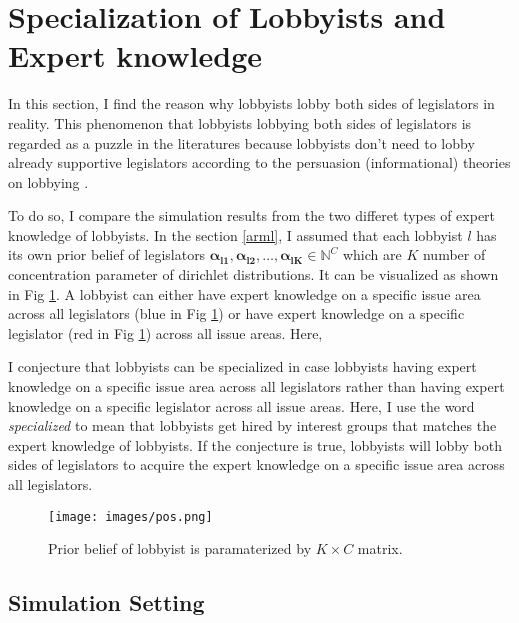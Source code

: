 \documentclass{article}
\begin{document}
\section{Specialization of Lobbyists and Expert knowledge}

In this section, I find the reason
why lobbyists lobby both sides of legislators in reality.
This phenomenon that lobbyists lobbying both sides of legislators 
is regarded as a puzzle in the literatures because lobbyists don't need to 
lobby already supportive legislators according to the persuasion (informational) theories on lobbying \citep{10.2307/2586303}.


To do so, I compare the simulation results from the two differet types of expert knowledge of lobbyists.
In the section \ref{arml}, I assumed 
that each lobbyist $l$ has its own prior belief of legislators $\mathbf{\alpha_{l1}}, \mathbf{\alpha_{l2}}, \hdots, \mathbf{\alpha_{lK}} \in \mathbb{N}^C$ which are $K$ number of concentration parameter of dirichlet distributions.
It can be visualized as shown in Fig \ref{fig:mesh1}. 
A lobbyist can either have expert knowledge 
on a specific issue area across all legislators (blue in Fig \ref{fig:mesh1}) or
have expert knowledge on a specific legislator (red in Fig \ref{fig:mesh1})
across all issue areas. 
Here, 

I conjecture that lobbyists can be specialized 
in case lobbyists having 
expert knowledge on a specific issue area across all legislators
rather than having expert knowledge 
on a specific legislator across all issue areas.
Here, I use the word \textit{specialized} to mean that
lobbyists get hired by interest groups 
that matches the expert knowledge of lobbyists.
If the conjecture is true, 
lobbyists will lobby both sides of legislators
to acquire 
the expert knowledge on a specific issue area
across all legislators.

\begin{figure}[h!]
    \centering
    \texttt{[image: images/pos.png]}
    \caption{Prior belief of lobbyist is paramaterized by $K \times C$ matrix.}
    \label{fig:mesh1}
\end{figure}



\subsection{\large{Simulation Setting}}
\end{document}
